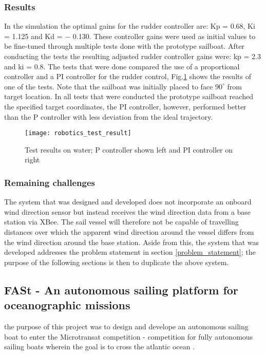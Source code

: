 \subsubsection{Results}

In the simulation the optimal gains for the rudder controller are: Kp = 0.68, Ki = 1.125 and Kd = − 0.130. These controller gains were used as initial values to be fine-tuned through
multiple tests done with the prototype sailboat. After conducting the tests the resulting adjusted rudder controller gains were: kp = 2.3 and ki = 0.8. The tests that were done 
compared the use of a proportional controller and a PI controller for the rudder control, Fig.\ref{fig:robotics_test_result} shows the results of one of the tests. Note that the 
sailboat was initially placed to face $90^{\circ}$ from target location. In all tests that were conducted the prototype sailboat reached the specified target coordinates, the PI 
controller, however, performed better than the P controller with less deviation from the ideal trajectory.

\begin{figure}[!h]
    \centering
    \texttt{[image: robotics\_test\_result]}
    \caption[Test results comparing P controller and PI controller]{Test results on water; P controller shown left and PI controller on right \cite{robotics5010005}}
    \label{fig:robotics_test_result}
\end{figure}

\subsubsection{Remaining challenges}

The system that was designed and developed does not incorporate an onboard wind direction sensor but instead receives the wind direction data from a base station via XBee. 
The sail vessel will therefore not be capable of travelling distances over which the apparent wind direction around the vessel differs from the wind direction around the base 
station. Aside from this, the system that was developed addresses the problem statement in section \ref{problem_statement}; the purpose of the following sections is then to duplicate the 
above system.


\subsection{FASt - An autonomous sailing platform for oceanographic missions}
the purpose of this project was to design and develope an autonomous sailing boat to enter the Microtransat competition - competition for fully autonomous sailing boats wherein the goal 
is to cross the atlantic ocean \cite{Alves2008FAStA}.

